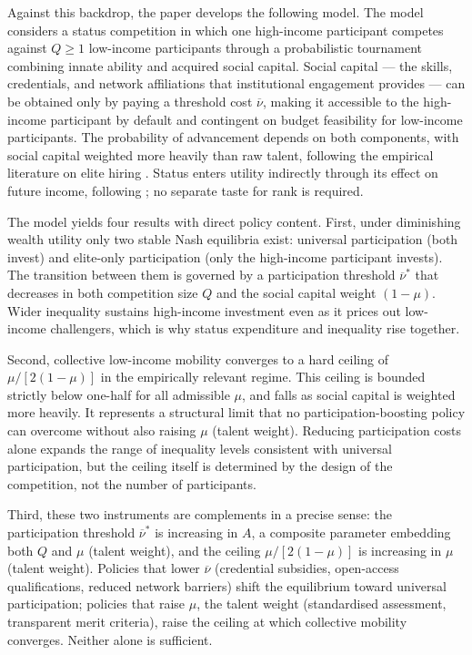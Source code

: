 \documentclass[
    oneside,
    fontsize=10pt,leqno]{article}
\begin{document}
Against this backdrop, the paper develops the following model.
The model considers a status competition in which one
high-income participant competes against $Q \geq 1$ low-income
participants through a probabilistic tournament combining innate
ability and acquired social capital. Social capital --- the skills,
credentials, and network affiliations that institutional engagement
provides --- can be obtained only by paying a threshold cost
$\overline{\nu}$, making it accessible to the high-income
participant by default and contingent on budget feasibility for
low-income participants. The probability of advancement depends on
both components, with social capital weighted more heavily than raw
talent, following the empirical literature on elite hiring
\citep{Rivera2015Pedigree, Bills2003Credentials}. Status enters
utility indirectly through its effect on future income, following
\citet{postlewaite1998socialbasisinterdeppreferences}; no separate
taste for rank is required.

The model yields four results with direct policy content.
First, under diminishing wealth utility only two stable
Nash equilibria exist: universal participation (both invest) and
elite-only participation (only the high-income participant invests).
The transition between them is governed by a participation threshold
$\overline{\nu}^{*}$ that decreases in both competition size $Q$
and the social capital weight $(1-\mu)$. Wider inequality sustains
high-income investment even as it prices out low-income
challengers, which is why status expenditure and inequality rise
together.

Second, collective low-income mobility converges to a hard ceiling
of $\mu/[2(1-\mu)]$ in the empirically relevant regime. This
ceiling is bounded strictly below one-half for all admissible
$\mu$, and falls as social capital is weighted more heavily. It
represents a structural limit that no participation-boosting policy
can overcome without also raising $\mu$ (talent weight). Reducing participation
costs alone expands the range of inequality levels consistent with
universal participation, but the ceiling itself is determined by
the design of the competition, not the number of participants.

Third, these two instruments are complements in a precise sense: the
participation threshold $\overline{\nu}^{*}$ is increasing in $A$,
a composite parameter embedding both $Q$ and $\mu$ (talent weight), and the ceiling
$\mu/[2(1-\mu)]$ is increasing in $\mu$ (talent weight). Policies that lower
$\overline{\nu}$ (credential subsidies, open-access qualifications,
reduced network barriers) shift the equilibrium toward universal
participation; policies that raise $\mu$, the talent weight (standardised assessment,
transparent merit criteria), raise the ceiling at which collective
mobility converges. Neither alone is sufficient.
\end{document}
